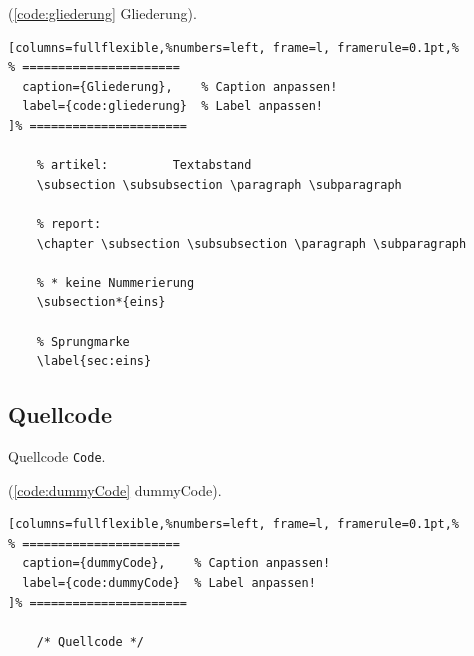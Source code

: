 (\autoref{code:gliederung} Gliederung).
\lstset{language=[LaTeX]TeX} %
\begin{lstlisting}[columns=fullflexible,%numbers=left, frame=l, framerule=0.1pt,%
% ======================
  caption={Gliederung},    % Caption anpassen!
  label={code:gliederung}  % Label anpassen!
]% ======================

	% artikel:         Textabstand
	\subsection \subsubsection \paragraph \subparagraph

	% report:
	\chapter \subsection \subsubsection \paragraph \subparagraph

	% * keine Nummerierung
	\subsection*{eins}

	% Sprungmarke
	\label{sec:eins}
\end{lstlisting}

\newpage

\subsection{Quellcode}

Quellcode \verb|Code|.

(\autoref{code:dummyCode} dummyCode).  %
\lstset{language=[LaTeX]TeX} %
\begin{lstlisting}[columns=fullflexible,%numbers=left, frame=l, framerule=0.1pt,%
% ======================
  caption={dummyCode},    % Caption anpassen!
  label={code:dummyCode}  % Label anpassen!
]% ======================

	/* Quellcode */
\end{lstlisting}


